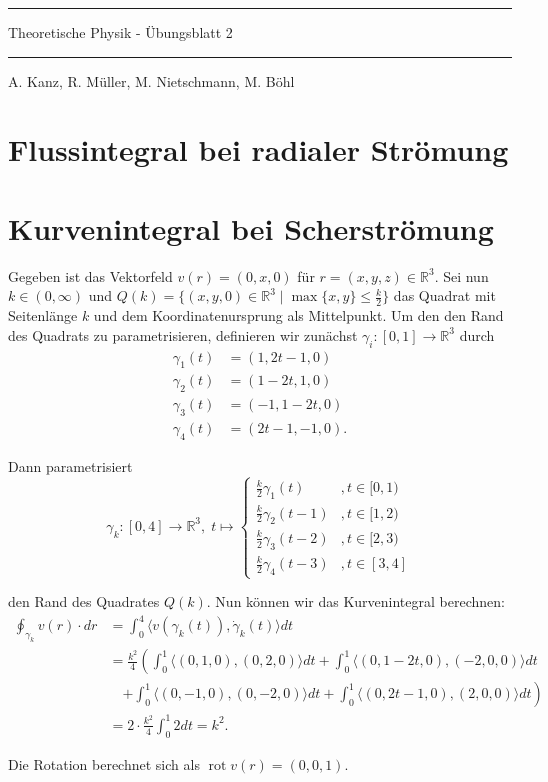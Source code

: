 \documentclass[11pt]{article}
\theoremstyle{plain}
\theoremstyle{definition}
\newcommand{\R}{\mathbb{R}}
\newcommand{\longto}{\longrightarrow}
\newcommand{\rot}{\operatorname{rot}}
\begin{document}
\pagestyle{fancy}
\thispagestyle{plain}

\rule{\textwidth}{.5pt}
\begin{center}
\Huge{Theoretische Physik - Übungsblatt 2}
\end{center}

\rule{\textwidth}{.5pt}
\text{} \hfill A. Kanz, R. Müller, M. Nietschmann, M. Böhl



\section{Flussintegral bei radialer Strömung}


\section{Kurvenintegral bei Scherströmung}
Gegeben ist das Vektorfeld $v(r) = (0, x, 0)$ für $r = (x,y,z) \in \R^3$. Sei nun $k \in (0, \infty)$ und $Q(k) = \{ (x,y,0) \in \R^3 \mid \max \{ x,y \} \leq \frac{k}{2} \}$ das Quadrat mit Seitenlänge $k$ und dem Koordinatenursprung als Mittelpunkt. Um den den Rand des Quadrats zu parametrisieren, definieren wir zunächst $\gamma_i : [0,1] \longto \R^3$ durch
\begin{align*}
\gamma_1 (t) &= (1, 2t-1, 0)\\
\gamma_2 (t) &= (1-2t, 1, 0)\\
\gamma_3 (t) &= (-1, 1-2t, 0)\\
\gamma_4 (t) &= (2t-1, -1, 0).
\end{align*}

Dann parametrisiert
\[ \gamma_k: [0,4] \longto \R^3,\; t \longmapsto \begin{cases}
\tfrac{k}{2}\gamma_1(t) &, t \in [0,1)\\
\tfrac{k}{2}\gamma_2(t-1) &, t \in [1,2)\\
\tfrac{k}{2}\gamma_3(t-2) &, t \in [2,3)\\
\tfrac{k}{2}\gamma_4(t-3) &, t \in [3,4]
\end{cases} \]

den Rand des Quadrates $Q(k)$. Nun können wir das Kurvenintegral berechnen:
\begin{align*}
\oint_{\gamma_k} v(r)\cdot dr &= \int_0^4 \langle v(\gamma_k(t)), \dot \gamma_k (t) \rangle dt \\
&= \frac{k^2}{4} \left( \int_0^1 \langle (0,1,0), (0,2,0) \rangle dt + \int_0^1 \langle (0, 1-2t, 0), (-2,0,0) \rangle dt \right.\\
&\quad \left. + \int_0^1 \langle (0,-1,0), (0,-2,0) \rangle dt + \int_0^1 \langle (0, 2t-1, 0), (2,0,0) \rangle dt \right)\\
&= 2\cdot\frac{k^2}{4} \int_0^1 2 dt = k^2.
\end{align*}

Die Rotation berechnet sich als $\rot v(r) = (0,0,1)$.
\end{document}
